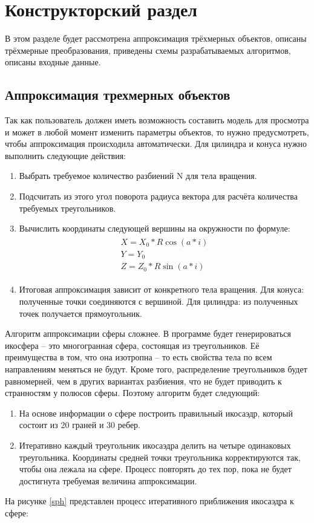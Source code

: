 \chapter{Конструкторский раздел}
В этом разделе будет рассмотрена аппроксимация трёхмерных объектов, описаны трёхмерные преобразования, приведены схемы разрабатываемых алгоритмов, описаны входные данные.
\section{Аппроксимация трехмерных объектов}
Так как пользователь должен иметь возможность составить модель для просмотра и может в любой момент изменить параметры объектов, то нужно предусмотреть, чтобы аппроксимация происходила автоматически. Для цилиндра и конуса нужно выполнить следующие действия:
\begin{enumerate}
\item Выбрать требуемое количество разбиений N для тела вращения.
\item Подсчитать из этого угол поворота радиуса вектора для расчёта количества требуемых треугольников.
\item Вычислить координаты следующей вершины на окружности по формуле:
\begin{align}
	\begin{gathered}
	X = X_0 * R\cos(a * i)\\
	Y = Y_0\\
	Z = Z_0 * R\sin(a * i)
	\end{gathered}
\end{align}
\item Итоговая аппроксимация зависит от конкретного тела вращения. Для конуса: полученные точки соединяются с вершиной. Для цилиндра: из полученных точек получается прямоугольник.
\end{enumerate}
Алгоритм аппроксимации сферы сложнее. В программе будет генерироваться икосфера – это многогранная сфера, состоящая из треугольников. Её преимущества в том, что она изотропна – то есть свойства тела
по всем направлениям меняться не будут. Кроме того, распределение треугольников будет равномерней, чем в других вариантах разбиения, что не будет приводить к странностям у полюсов сферы. Поэтому алгоритм будет
следующий:
\begin{enumerate}
\item На основе информации о сфере построить правильный икосаэдр, который состоит из 20 граней и 30 ребер.

\item Итеративно каждый треугольник икосаэдра делить на четыре одинаковых треугольника. Координаты средней точки треугольника корректируются так, чтобы она лежала на сфере. Процесс повторять до тех пор, пока не будет достигнута требуемая величина аппроксимации.
\end{enumerate}
На рисунке \ref{sph} представлен процесс итеративного приближения икосаэдра к сфере:

